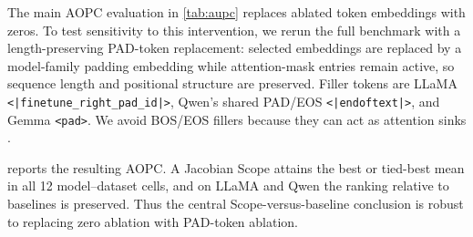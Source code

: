 \documentclass{article}
\begin{document}
The main AOPC evaluation in \cref{tab:aupc} replaces ablated token embeddings with zeros.
To test sensitivity to this intervention, we rerun the full benchmark with a length-preserving PAD-token replacement: selected embeddings are replaced by a model-family padding embedding while attention-mask entries remain active, so sequence length and positional structure are preserved.
Filler tokens are LLaMA \texttt{<|finetune\_right\_pad\_id|>}, Qwen's shared PAD/EOS \texttt{<|endoftext|>}, and Gemma \texttt{<pad>}.
We avoid BOS/EOS fillers because they can act as attention sinks \cite{Xiao-attention-sink-2024}.

 reports the resulting AOPC.
A Jacobian Scope attains the best or tied-best mean in all 12 model--dataset cells, and on LLaMA and Qwen the ranking relative to baselines is preserved.
Thus the central Scope-versus-baseline conclusion is robust to replacing zero ablation with PAD-token ablation.
\end{document}
